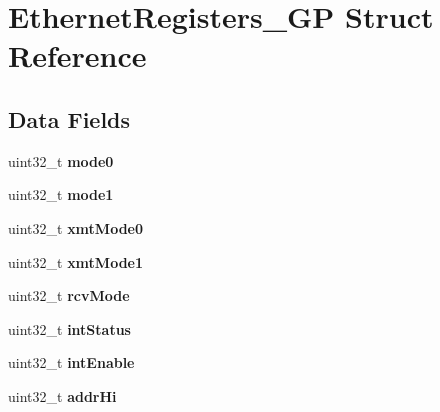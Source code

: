 \hypertarget{structEthernetRegisters__GP}{}\section{Ethernet\+Registers\+\_\+\+GP Struct Reference}
\label{structEthernetRegisters__GP}
\subsection*{Data Fields}
\begin{DoxyCompactItemize}
\item 
\mbox{\label{structEthernetRegisters__GP_a055252812cfab16e40be308f159ba927}} 
uint32\+\_\+t {\bfseries mode0}
\item 
\mbox{\label{structEthernetRegisters__GP_aad0fb85e2a51d438aa5c859ccaaed1b0}} 
uint32\+\_\+t {\bfseries mode1}
\item 
\mbox{\label{structEthernetRegisters__GP_a939db0313bc6d6c21721a5bc5ae0cd06}} 
uint32\+\_\+t {\bfseries xmt\+Mode0}
\item 
\mbox{\label{structEthernetRegisters__GP_adb0980b287df600023ef0c0c72981b1f}} 
uint32\+\_\+t {\bfseries xmt\+Mode1}
\item 
\mbox{\label{structEthernetRegisters__GP_a8642ff0802db0c8e6390bde5e52e66d7}} 
uint32\+\_\+t {\bfseries rcv\+Mode}
\item 
\mbox{\label{structEthernetRegisters__GP_afd724fec2f478f707c876c0c104f790b}} 
uint32\+\_\+t {\bfseries int\+Status}
\item 
\mbox{\label{structEthernetRegisters__GP_a23d5d2efa5c6bc8133acdc2795363e14}} 
uint32\+\_\+t {\bfseries int\+Enable}
\item 
\mbox{\label{structEthernetRegisters__GP_ad1c7b5c590630adafecd872513afd159}} 
uint32\+\_\+t {\bfseries addr\+Hi}
\item 
\mbox{\label{structEthernetRegisters__GP_ae6c119e8ad089b95ca25ff79cc74928f}} 

\end{DoxyCompactItemize}
